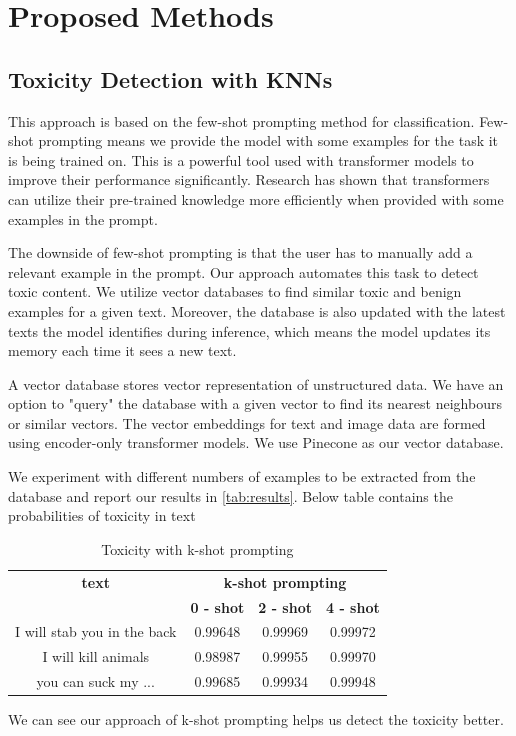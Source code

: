 \section{Proposed Methods}


\subsection{Toxicity Detection with KNNs}

This approach is based on the few-shot prompting method for classification.
Few-shot prompting means we provide the model with some examples for the task it is being trained on.
This is a powerful tool used with transformer models to improve their performance significantly.
Research has shown that transformers can utilize their pre-trained knowledge more efficiently when provided with some examples in the prompt.

The downside of few-shot prompting is that the user has to manually add a relevant example in the prompt.
Our approach automates this task to detect toxic content.
We utilize vector databases to find similar toxic and benign examples for a given text.
Moreover, the database is also updated with the latest texts the model identifies during inference, which means the model updates its memory each time it sees a new text.

A vector database stores vector representation of unstructured data.
We have an option to "query" the database with a given vector to find its nearest neighbours or similar vectors.
The vector embeddings for text and image data are formed using encoder-only transformer models.
We use Pinecone as our vector database.

We experiment with different numbers of examples to be extracted from the database and report our results in \autoref{tab:results}.
Below table contains the probabilities of toxicity in text

\begin{table}[h!]
\centering
\begin{tabular}{|c|c|c|c|}
\hline
{\textbf{text}} & \multicolumn{3}{c|}{\textbf{k-shot prompting}} \\ \cline{2-4} 
& \textbf{0 - shot} & \textbf{2 - shot} & \textbf{4 - shot} \\ \hline
I will stab you in the back& 0.99648 & 0.99969 & 0.99972\\ \hline
I will kill animals& 0.98987 & 0.99955 & 0.99970 \\ \hline
you can suck my ... & 0.99685 & 0.99934 & 0.99948 \\ \hline
\end{tabular}
\caption{Toxicity with k-shot prompting}
\label{tab:results}
\end{table}
We can see our approach of k-shot prompting helps us detect the toxicity better.


